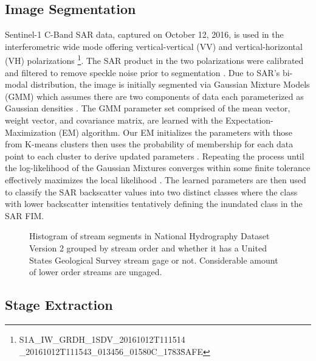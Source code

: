 \documentclass{article}
\begin{document}
\subsection{Image Segmentation}
\label{ssec:image_segmentation}

Sentinel-1 C-Band SAR data, captured on October 12, 2016, is used in the interferometric wide mode offering vertical-vertical (VV) and vertical-horizontal (VH) polarizations \cite{copernicus2016sentinel} \footnote{S1A\_IW\_GRDH\_1SDV\_20161012T111514 \_20161012T111543\_013456\_01580C\_1783\.SAFE}. 
The SAR product in the two polarizations were calibrated and filtered to remove speckle noise prior to segmentation \cite{zuhlke2015snap,yommy2015sar}. 
Due to SAR's bi-modal distribution, the image is initially segmented via Gaussian Mixture Models (GMM) which assumes there are two components of data each parameterized as Gaussian densities \cite{reynolds2009gaussian,mclachlan2004finite}.
The GMM parameter set comprised of the mean vector, weight vector, and covariance matrix, are learned with the Expectation-Maximization (EM) algorithm. 
Our EM initializes the parameters with those from K-means clusters then uses the probability of membership for each data point to each cluster to derive updated parameters \cite{barazandeh2018behavior,dempster1977maximum}. 
Repeating the process until the log-likelihood of the Gaussian Mixtures converges within some finite tolerance effectively maximizes the local likelihood \cite{barazandeh2018behavior,dempster1977maximum}.
The learned parameters are then used to classify the SAR backscatter values into two distinct classes where the class with lower backscatter intensities tentatively defining the inundated class in the SAR FIM.

\begin{figure}[htb]

\begin{minipage}[b]{1.0\linewidth}
  \centering
 \centerline{}
\end{minipage}

\caption{Histogram of stream segments in National Hydrography Dataset Version 2 grouped by stream order and whether it has a United States Geological Survey stream gage or not. Considerable amount of lower order streams are ungaged.}
\label{fig:histogram_gages}

\end{figure}

\subsection{Stage Extraction}
\label{ssec:stage_extraction}
\end{document}
